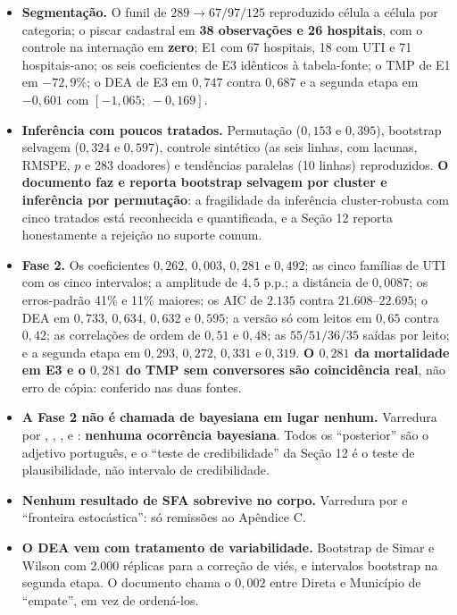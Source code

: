 \documentclass[12pt,a4paper]{article}
\newcommand{\arq}[1]{\texttt{\detokenize{#1}}}
\begin{document}
\begin{itemize}[leftmargin=*]
\item \textbf{Segmentação.} O funil de $289 \rightarrow 67/97/125$
  reproduzido célula a célula por categoria; o piscar cadastral em
  \textbf{38 observações e 26 hospitais}, com o controle na internação
  em \textbf{zero}; E1 com 67 hospitais, 18 com UTI e 71 hospitais-ano;
  os seis coeficientes de E3 idênticos à tabela-fonte; o TMP de E1 em
  $-72{,}9\%$; o DEA de E3 em $0{,}747$ contra $0{,}687$ e a segunda
  etapa em $-0{,}601$ com $[-1{,}065;\ -0{,}169]$.

\item \textbf{Inferência com poucos tratados.} Permutação
  ($0{,}153$ e $0{,}395$), bootstrap selvagem ($0{,}324$ e $0{,}597$),
  controle sintético (as seis linhas, com lacunas, RMSPE, $p$ e 283
  doadores) e tendências paralelas (10 linhas) reproduzidos.
  \textbf{O documento faz e reporta bootstrap selvagem por cluster e
  inferência por permutação}: a fragilidade da inferência
  cluster-robusta com cinco tratados está reconhecida e quantificada, e
  a Seção 12 reporta honestamente a rejeição no suporte comum.

\item \textbf{Fase 2.} Os coeficientes $0{,}262$, $0{,}003$, $0{,}281$ e
  $0{,}492$; as cinco famílias de UTI com os cinco intervalos; a
  amplitude de $4{,}5$ p.p.; a distância de $0{,}0087$; os erros-padrão
  41\% e 11\% maiores; os AIC de $2.135$ contra $21.608$--$22.695$; o
  DEA em $0{,}733$, $0{,}634$, $0{,}632$ e $0{,}595$; a versão só com
  leitos em $0{,}65$ contra $0{,}42$; as correlações de ordem de
  $0{,}51$ e $0{,}48$; as $55/51/36/35$ saídas por leito; e a segunda
  etapa em $0{,}293$, $0{,}272$, $0{,}331$ e $0{,}319$.
  \textbf{O $0{,}281$ da mortalidade em E3 e o $0{,}281$ do TMP sem
  conversores são coincidência real}, não erro de cópia: conferido nas
  duas fontes.

\item \textbf{A Fase 2 não é chamada de bayesiana em lugar nenhum.}
  Varredura por \arq{bayes}, \arq{priori}, \arq{posterior},
  \arq{credibilidade} e \arq{MCMC}: \textbf{nenhuma ocorrência
  bayesiana}. Todos os ``posterior'' são o adjetivo português, e o
  ``teste de credibilidade'' da Seção 12 é o teste de plausibilidade,
  não intervalo de credibilidade.

\item \textbf{Nenhum resultado de SFA sobrevive no corpo.} Varredura por
  \arq{SFA} e ``fronteira estocástica'': só remissões ao Apêndice C.

\item \textbf{O DEA vem com tratamento de variabilidade.} Bootstrap de
  Simar e Wilson com 2.000 réplicas para a correção de viés, e
  intervalos bootstrap na segunda etapa. O documento chama o $0{,}002$
  entre Direta e Município de ``empate'', em vez de ordená-los.


\end{itemize}
\end{document}
